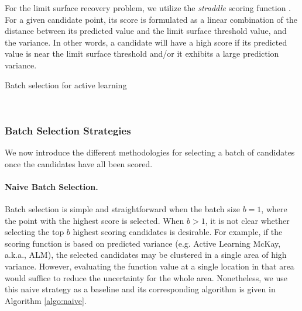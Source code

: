 For the limit surface recovery problem, we utilize the \emph{straddle} scoring function \cite{BryanSchneiderNichol2005}.
%
For a given candidate point, its score is formulated as a linear combination of the distance between its predicted value and the limit surface threshold value, and the variance.
%
In other words, a candidate will have a high score if its predicted value is near the limit surface threshold and/or it exhibits a large prediction variance.

{\fontsize{10}{10}\selectfont
\begin{algorithm}
\scriptsize
\caption{Batch selection for active learning}
\label{algo:al}
\begin{algorithmic}
\\
\EndWhile
\end{algorithmic}
\end{algorithm}
}

\subsubsection{Batch Selection Strategies}
\label{batch_description}

We now introduce the different methodologies for selecting a batch of candidates once the candidates have all been scored.

\paragraph{Naive Batch Selection.}
Batch selection is simple and straightforward when the batch size $b = 1$, where the point with the highest score is selected.
%
When $b>1$, it is not clear whether selecting the top $b$ highest scoring candidates is desirable.
%
For example, if the scoring function is based on predicted variance (e.g. Active Learning McKay, a.k.a., ALM), the selected candidates may be clustered in a single area of high variance.
%
However, evaluating the function value at a single location in that area would suffice to reduce the uncertainty for the whole area.
%
Nonetheless, we use this naive strategy as a baseline and its corresponding algorithm is given in Algorithm \ref{algo:naive}.

